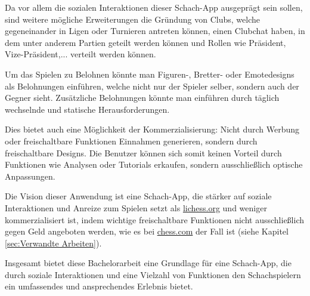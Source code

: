 Da vor allem die sozialen Interaktionen dieser Schach-App ausgeprägt sein sollen, sind weitere mögliche Erweiterungen die Gründung von Clubs, welche gegeneinander in Ligen oder Turnieren antreten können, einen Clubchat haben, in dem unter anderem Partien geteilt werden können und Rollen wie Präsident, Vize-Präsident,... verteilt werden können.
 
Um das Spielen zu Belohnen könnte man Figuren-, Bretter- oder Emotedesigns als Belohnungen einführen, welche nicht nur der Spieler selber, sondern auch der Gegner sieht. Zusätzliche Belohnungen könnte man einführen durch täglich wechselnde und statische Herausforderungen.

Dies bietet auch eine Möglichkeit der Kommerzialisierung: Nicht durch Werbung oder freischaltbare Funktionen Einnahmen generieren, sondern durch freischaltbare Designs. Die Benutzer können sich somit keinen Vorteil durch Funktionen wie Analysen oder Tutorials erkaufen, sondern ausschließlich optische Anpassungen.

Die Vision dieser Anwendung ist eine Schach-App, die stärker auf soziale Interaktionen und Anreize zum Spielen setzt als \url{lichess.org} und weniger kommerzialisiert ist, indem wichtige freischaltbare Funktionen nicht ausschließlich gegen Geld angeboten werden, wie es bei \url{chess.com} der Fall ist (siehe Kapitel \ref{sec:Verwandte Arbeiten}).

Insgesamt bietet diese Bachelorarbeit eine Grundlage für eine Schach-App, die durch soziale Interaktionen und eine Vielzahl von Funktionen den Schachspielern ein umfassendes und ansprechendes Erlebnis bietet.